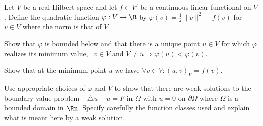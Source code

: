 Let $V$ be a real Hilbert space and let $f\in V'$ be a continuous
linear functional on $V$. Define the quadratic function
$\varphi:V\rightarrow \R$ by $\varphi(v)=\frac{1}{2}\|v\|^2-f(v)$ for
$v\in V$ where the norm is that of $V$.
\begin{alist}
\item Show that $\varphi$ is bounded below and that there is a unique
point $u\in V$ for which $\varphi$ realizes its minimum value, \ie\
$v\in V$ and $V\neq u\Rightarrow \varphi(u)<\varphi(v)$.
\item Show that at the minimum point $u$ we have $\forall v\in
V:(u,v)_V=f(v)$.
\item Use appropriate choices of $\varphi$ and $V$ to show that there
are weak solutions to the boundary value problem $-\triangle u+u=F$ in
$\Omega$ with $u=0$ on $\partial \Omega$ where $\Omega$ is a bounded
domain in $\Rn$. Specify carefully the function classes used and
explain what is meant here by a weak solution.
\end{alist}
